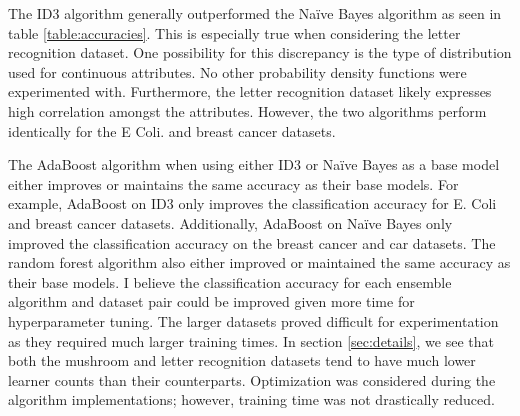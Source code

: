 \documentclass[11pt]{article}
\begin{document}
The ID3 algorithm generally outperformed the Naïve Bayes algorithm as seen in table \ref{table:accuracies}. This is especially true when considering the letter recognition dataset. One possibility for this discrepancy is the type of distribution used for continuous attributes. No other probability density functions were experimented with. Furthermore, the letter recognition dataset likely expresses high correlation amongst the attributes. However, the two algorithms perform identically for the E Coli. and breast cancer datasets.

The AdaBoost algorithm when using either ID3 or Naïve Bayes as a base model either improves or maintains the same accuracy as their base models. For example, AdaBoost on ID3 only improves the classification accuracy for E. Coli and breast cancer datasets. Additionally, AdaBoost on Naïve Bayes only improved the classification accuracy on the breast cancer and car datasets. The random forest algorithm also either improved or maintained the same accuracy as their base models. I believe the classification accuracy for each ensemble algorithm and dataset pair could be improved given more time for hyperparameter tuning. The larger datasets proved difficult for experimentation as they required much larger training times. In section \ref{sec:details}, we see that both the mushroom and letter recognition datasets tend to have much lower learner counts than their counterparts. Optimization was considered during the algorithm implementations; however, training time was not drastically reduced.



\end{document}
